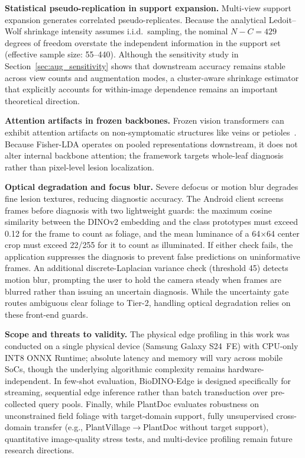 \textbf{Statistical pseudo-replication in support expansion.} Multi-view support expansion generates correlated pseudo-replicates. Because the analytical Ledoit--Wolf shrinkage intensity assumes i.i.d.\ sampling, the nominal $N-C=429$ degrees of freedom overstate the independent information in the support set (effective sample size: 55--440). Although the sensitivity study in Section~\ref{sec:aug_sensitivity} shows that downstream accuracy remains stable across view counts and augmentation modes, a cluster-aware shrinkage estimator that explicitly accounts for within-image dependence remains an important theoretical direction.

\textbf{Attention artifacts in frozen backbones.} Frozen vision transformers can exhibit attention artifacts on non-symptomatic structures like veins or petioles~\cite{darcet2024vision}. Because Fisher-LDA operates on pooled representations downstream, it does not alter internal backbone attention; the framework targets whole-leaf diagnosis rather than pixel-level lesion localization.

\textbf{Optical degradation and focus blur.} Severe defocus or motion blur degrades fine lesion textures, reducing diagnostic accuracy. The Android client screens frames before diagnosis with two lightweight guards: the maximum cosine similarity between the DINOv2 embedding and the class prototypes must exceed 0.12 for the frame to count as foliage, and the mean luminance of a 64$\times$64 center crop must exceed 22/255 for it to count as illuminated. If either check fails, the application suppresses the diagnosis to prevent false predictions on uninformative frames. An additional discrete-Laplacian variance check (threshold 45) detects motion blur, prompting the user to hold the camera steady when frames are blurred rather than issuing an uncertain diagnosis. While the uncertainty gate routes ambiguous clear foliage to Tier-2, handling optical degradation relies on these front-end guards.

\textbf{Scope and threats to validity.} The physical edge profiling in this work was conducted on a single physical device (Samsung Galaxy S24~FE) with CPU-only INT8 ONNX Runtime; absolute latency and memory will vary across mobile SoCs, though the underlying algorithmic complexity remains hardware-independent. In few-shot evaluation, BioDINO-Edge is designed specifically for streaming, sequential edge inference rather than batch transduction over pre-collected query pools. Finally, while PlantDoc evaluates robustness on unconstrained field foliage with target-domain support, fully unsupervised cross-domain transfer (e.g., PlantVillage$\rightarrow$PlantDoc without target support), quantitative image-quality stress tests, and multi-device profiling remain future research directions.

